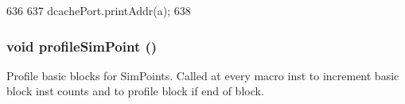 \begin{DoxyCode}
636 {
637     dcachePort.printAddr(a);
638 }
\end{DoxyCode}
\hypertarget{classAtomicSimpleCPU_aa51e4d7f169cd8e8b2e144fdcfd36f33}{
\subsubsection[{profileSimPoint}]{\setlength{\rightskip}{0pt plus 5cm}void profileSimPoint ()}}
\label{classAtomicSimpleCPU_aa51e4d7f169cd8e8b2e144fdcfd36f33}
Profile basic blocks for SimPoints. Called at every macro inst to increment basic block inst counts and to profile block if end of block. 


